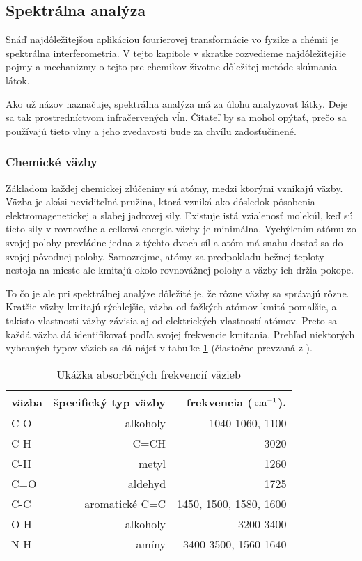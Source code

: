 \subsection{Spektrálna analýza}

Snáď najdôležitejšou aplikáciou fourierovej transformácie vo fyzike a
chémii je spektrálna interferometria. V tejto kapitole v skratke
rozvedieme najdôležitejšie pojmy a mechanizmy o tejto pre chemikov
životne dôležitej metóde skúmania látok.

Ako už názov naznačuje, spektrálna analýza má za úlohu analyzovať
látky. Deje sa tak prostredníctvom infračervených vĺn. Čitateľ by sa
mohol opýtať, prečo sa používajú tieto vlny a jeho zvedavosti bude za
chvíľu zadosťučinené.

\subsubsection{Chemické väzby}
Základom každej chemickej zlúčeniny sú atómy, medzi ktorými vznikajú
väzby. Väzba je akási neviditeľná pružina, ktorá vzniká ako dôsledok
pôsobenia elektromagenetickej a slabej jadrovej sily. Existuje istá
vzialenosť molekúl, keď sú tieto sily v rovnováhe a celková energia
väzby je minimálna. Vychýlením atómu zo svojej polohy prevládne jedna
z týchto dvoch síl a atóm má snahu dostať sa do svojej pôvodnej
polohy. Samozrejme, atómy za predpokladu bežnej teploty nestoja na
mieste ale kmitajú okolo rovnovážnej polohy a väzby ich držia pokope.

To čo je ale pri spektrálnej analýze dôležité je, že rôzne väzby sa
správajú rôzne. Kratšie väzby kmitajú rýchlejšie, väzba od ťažkých
atómov kmitá pomalšie, a takisto vlastnosti väzby závisia aj od
elektrických vlastností atómov. Preto sa každá väzba dá identifikovať
podľa svojej frekvencie kmitania. Prehľad niektorých vybraných typov
väzieb sa dá nájsť v tabuľke \ref{tab:vazby} (čiastočne prevzaná z \cite{wiki:spectro}).

\begin{table}[htb]
\begin{tabular}{| l | r | r |}
\hline
väzba & špecifický typ väzby & frekvencia ($\,\mbox{cm}^{-1}$). \\ \hline
C-O & alkoholy & 1040-1060, 1100 \\ \hline
C-H & C=CH & 3020 \\ \hline
C-H & metyl & 1260 \\ \hline
C=O & aldehyd & 1725 \\ \hline
C-C & aromatické C=C & 1450, 1500, 1580, 1600 \\ \hline
O-H & alkoholy & 3200-3400 \\ \hline
N-H & amíny & 3400-3500, 1560-1640 \\ \hline
\end{tabular}
\caption{Ukážka absorbčných frekvencií väzieb}\label{tab:vazby}
\end{table}

